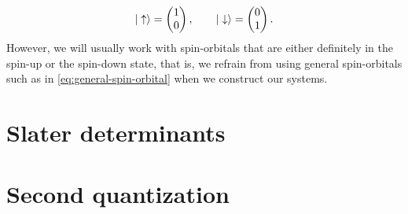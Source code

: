         \begin{align}
            | \uparrow \rangle
            =
            \begin{pmatrix}
                1 \\
                0
            \end{pmatrix},
            \qquad
            | \downarrow \rangle
            =
            \begin{pmatrix}
                0 \\
                1
            \end{pmatrix}.
        \end{align}
        However, we will usually work with spin-orbitals that are either
        definitely in the spin-up or the spin-down state, that is, we refrain
        from using general spin-orbitals such as in
        \autoref{eq:general-spin-orbital} when we construct our systems.


    \section{Slater determinants}

    \section{Second quantization}

